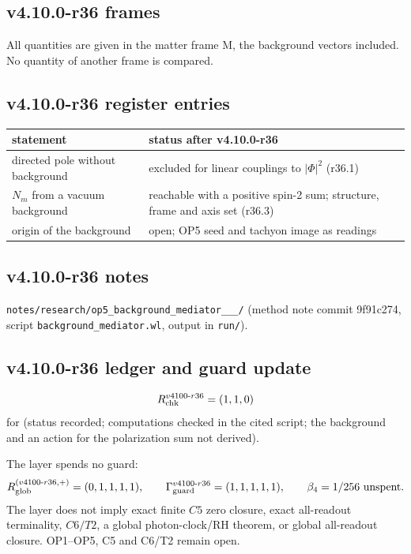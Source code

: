 \subsection*{v4.10.0-r36 frames}
\label{subsec:v4100-r36-frames}

All quantities are given in the matter frame M, the background vectors included.  No quantity of another frame is compared.

\subsection*{v4.10.0-r36 register entries}
\label{subsec:v4100-r36-register}

\begin{center}
\small
\begin{tabular}{@{}>{\raggedright\arraybackslash}p{}>{\raggedright\arraybackslash}p{}@{}}
\toprule
statement & status after v4.10.0-r36\\
\midrule
directed pole without background & excluded for linear couplings to \(|\Phi|^2\) (r36.1)\\
\(N_m\) from a vacuum background & reachable with a positive spin-2 sum; structure, frame and axis set (r36.3)\\
origin of the background & open; OP5 seed and tachyon image as readings\\
\bottomrule
\end{tabular}
\end{center}

\subsection*{v4.10.0-r36 notes}
\label{subsec:v4100-r36-notes}

\texttt{notes/\allowbreak research/\allowbreak op5\_\allowbreak background\_\allowbreak mediator\_\_\_/} (method note commit 9f91c274,
script \texttt{background\_\allowbreak mediator.wl}, output in \texttt{run/}).

\subsection*{v4.10.0-r36 ledger and guard update}
\label{subsec:v4100-r36-ledger-guard}

\[
R_{\rm chk}^{v4100\text{-}r36}=(1,1,0)
\]
for (status recorded; computations checked in the cited script; the background and an action for the polarization sum not derived).

The layer spends no guard:
\[
R_{\rm glob}^{(v4100\text{-}r36,+)}=(0,1,1,1,1),
\qquad
\Gamma_{\rm guard}^{v4100\text{-}r36}=(1,1,1,1,1),
\qquad
\beta_4=1/256\ \text{unspent}.
\]
The layer does not imply exact finite \(C5\) zero closure, exact all-readout terminality, \(C6/T2\), a global photon-clock/RH theorem,
or global all-readout closure.  OP1--OP5, C5 and C6/T2 remain open.
